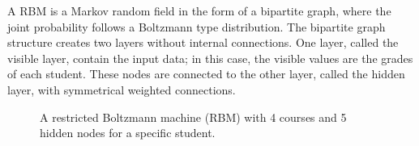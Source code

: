 A RBM is a Markov random field in the form of a bipartite graph,
where the joint probability follows a Boltzmann type distribution.
The bipartite graph structure creates two layers without
internal connections.
One layer, called the visible layer, contain the input data; 
in this case, the visible values are the grades of each student.
These nodes are connected to the other layer, called the hidden layer,
with symmetrical weighted connections.
%
\def\layersep{2.5cm}
\begin{figure}[h]
\centering{}

\caption{\label{fig:RBM}
A restricted Boltzmann machine (RBM) with 4 courses and 5 hidden
nodes for a specific student.
}
\end{figure}

